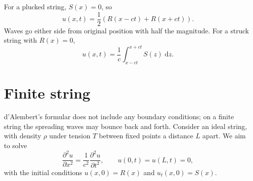 \documentclass[letter-paper]{tufte-book}
\newenvironment{example}[1][Example]{\begin{trivlist}
\item[\hskip \labelsep {\bfseries #1}]}{\end{trivlist}}
\newcommand{\dy}{\partial}
\newcommand{\ddy}[2]{\frac{\dy#1}{\dy#2}}
\begin{document}
\begin{example}
For a plucked string, $S(x) = 0$, so
\begin{equation*}
  u(x,t) = \frac{1}{2}\left(R(x-ct) + R(x+ct) \right).
\end{equation*}
Waves go either side from original position with half the magnitude. For a
struck string with $R(x) = 0$,
\begin{equation*}
  u(x,t) = \frac{1}{c} \int_{x-ct}^{x+ct} S(z)\; \mathrm{d}z.
\end{equation*}
\end{example}


\section{Finite string}

d'Alembert's formular does not include any boundary conditions; on a finite
string the spreading waves may bounce back and forth. Consider an ideal string,
with density $\rho$ under tension $T$ between fixed points a distance $L$ apart.
We aim to solve
\begin{equation*}
  \ddy{^2 u}{x^2} = \frac{1}{c^2}\ddy{^2 u}{t^2}, \qquad
  u(0,t) = u(L,t) = 0,
\end{equation*}
with the initial conditions $u(x, 0) = R(x)$ and $u_t (x, 0) = S(x)$.
\end{document}
